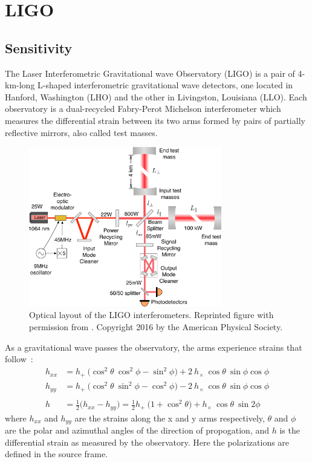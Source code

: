 \documentclass [12pt, proquest]{uwthesis}[2019]
\begin{document}
\section{LIGO}

\subsection{Sensitivity}

The Laser Interferometric Gravitational wave Observatory (LIGO) \cite{aLIGO} is a pair of 4-km-long L-shaped interferometric gravitational wave detectors, one located in Hanford, Washington (LHO) and the other in Livingston, Louisiana (LLO). Each observatory is a dual-recycled Fabry-Perot Michelson interferometer which measures the differential strain between its two arms formed by pairs of partially reflective mirrors, also called test masses. 
\begin{figure}[!h]
\begin{center}
\includegraphics[width=0.75\textwidth]{LIGO_Schematic.pdf}
\caption[Optical layout of the LIGO interferometers]{Optical layout of the LIGO interferometers. Reprinted figure with permission from \cite{LIGOSens}. Copyright 2016 by the American Physical Society.}
\label{LIGO_Schematic}
\end{center}
\end{figure}

\pagebreak
As a gravitational wave passes the observatory, the arms experience strains that follow~\cite{GWBook}:
\begin{align}
h_{xx}&=h_+\ \big( \cos^2\theta\ \cos^2\phi-\sin^2\phi \big)+2\ h_\times\ \cos \theta\ \sin \phi \cos \phi \\
h_{yy}&=h_+\ \big( \cos^2\theta\ \sin^2\phi-\cos^2\phi \big)-2\ h_\times\ \cos \theta\ \sin \phi \cos \phi \\
\nonumber \\
h&=\frac{1}{2} \big( h_{xx}-h_{yy} \big)=\frac{1}{2}h_+\ \big( 1+\cos^2\theta \big)+ h_\times\ \cos \theta\ \sin 2 \phi 
\end{align}
where $h_{xx}$ and $h_{yy}$ are the strains along the x and y arms respectively, $\theta$ and $\phi$ are the polar and azimuthal angles of the direction of propogation, and $h$ is the differential strain as measured by the observatory. Here the polarizations are defined in the source frame.
\end{document}
